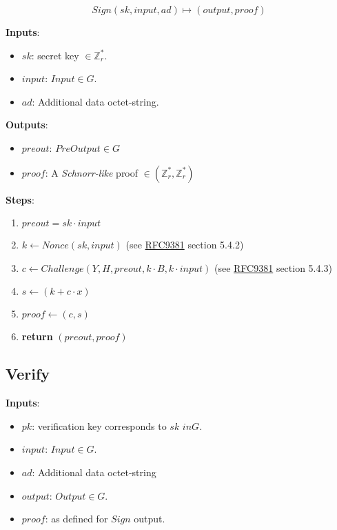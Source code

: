 \documentclass[
]{article}
\providecommand{\tightlist}{%
  \setlength{\itemsep}{0pt}\setlength{\parskip}{0pt}}
\begin{document}
\[ Sign(sk, input, ad) \mapsto (output, proof) \]

\textbf{Inputs}:

\begin{itemize}
\tightlist
\item
  \(sk\): secret key \(\in \mathbb{Z}^*_r\).
\item
  \(input\): \(Input \in G\).
\item
  \(ad\): Additional data octet-string.
\end{itemize}

\textbf{Outputs}:

\begin{itemize}
\tightlist
\item
  \(preout\): \(PreOutput \in G\)
\item
  \(proof\): A \emph{Schnorr-like} proof
  \(\in (\mathbb{Z}^*_r, \mathbb{Z}^*_r)\)
\end{itemize}

\textbf{Steps}:

\begin{enumerate}
\def\labelenumi{\arabic{enumi}.}
\tightlist
\item
  \(preout = sk \cdot input\)
\item
  \(k \leftarrow Nonce(sk, input)\) (see
  \href{https://datatracker.ietf.org/doc/rfc9381/}{RFC9381} section
  5.4.2)
\item
  \(c \leftarrow Challenge(Y, H, preout, k \cdot B, k \cdot input)\)
  (see \href{https://datatracker.ietf.org/doc/rfc9381/}{RFC9381} section
  5.4.3)
\item
  \(s \leftarrow (k + c \cdot x)\)
\item
  \(proof \leftarrow (c, s)\)
\item
  \textbf{return} \((preout, proof)\)
\end{enumerate}

\hypertarget{verify}{%
\subsection{Verify}\label{verify}}

\textbf{Inputs}:

\begin{itemize}
\tightlist
\item
  \(pk\): verification key corresponds to \(sk\) \(in G\).
\item
  \(input\): \(Input \in G\).
\item
  \(ad\): Additional data octet-string
\item
  \(output\): \(Output \in G\).
\item
  \(proof\): as defined for \(Sign\) output.
\end{itemize}
\end{document}
